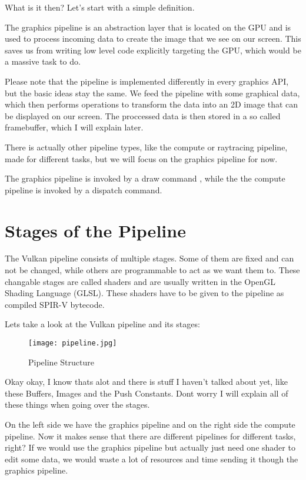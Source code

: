 \documentclass[12pt]{report} \usepackage {preamble}
\begin{document}
What is it then? Let's start with a simple definition.

The graphics pipeline is an abstraction layer that is located on the
GPU and is used to process incoming data to create the image that we see
on our screen. \cite{vkGuide} This saves us from writing low level code
explicitly targeting the GPU, which would be a massive task to do.

Please note that the pipeline is implemented differently in every graphics
API, but the basic ideas stay the same. We feed the pipeline with some
graphical data, which then performs operations to transform the data into
an 2D image that can be displayed on our screen. The proccessed data
is then stored in a so called framebuffer, which I will explain later.
\cite{vkGuide}

There is actually other pipeline types, like the compute or raytracing
pipeline, made for different tasks, but we will focus on the graphics
pipeline for now.

The graphics pipeline is invoked by a draw command \cite{build-pipeline},
while the the compute pipeline is invoked by a dispatch
command. \cite{vulkan-tutorial-compute-shader}

\section {Stages of the Pipeline}

The Vulkan pipeline consists of multiple stages. Some of them are fixed
and can not be changed, while others are programmable to act as we
want them to. These changable stages are called shaders and are usually
written in the OpenGL Shading Language (GLSL). These shaders have to be
given to the pipeline as compiled SPIR-V bytecode. \cite{spirv}

Lets take a look at the Vulkan pipeline and its stages:

\begin{figure}[hbtp]
	\centering \texttt{[image: pipeline.jpg]} \caption{Pipeline
		Structure \cite{fig:pipeline}}
\end{figure}

Okay okay, I know thats alot and there is stuff I haven't talked about
yet, like these Buffers, Images and the Push Constants.  Dont worry I
will explain all of these things when going over the stages.

On the left side we have the graphics pipeline and on the right side the
compute pipeline. Now it makes sense that there are different pipelines
for different tasks, right? If we would use the graphics pipeline but
actually just need one shader to edit some data, we would waste a lot
of resources and time sending it though the graphics pipeline.
\end{document}
